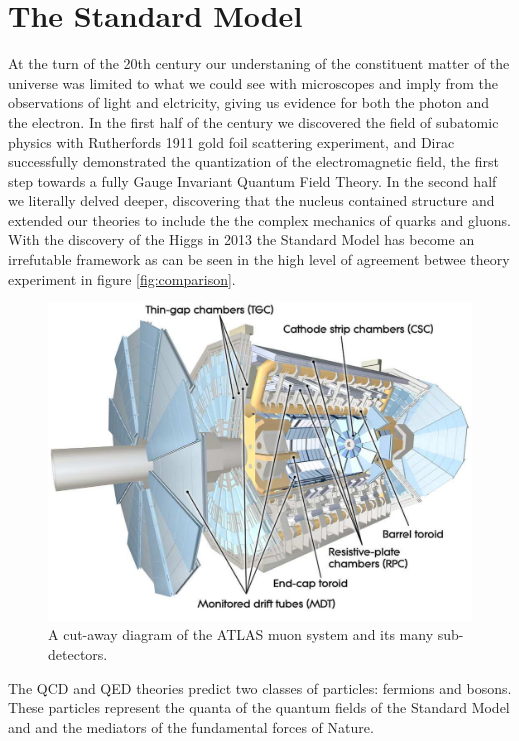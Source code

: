 \section{The Standard Model} \label{sec:theory:standardmodel}

At the turn of the 20th century our understaning of the constituent matter of
the universe was limited to what we could see with microscopes and imply from
the observations of light and elctricity, giving us evidence for both the photon
and the electron.  In the first half of the century we discovered the field of
subatomic physics with Rutherfords 1911 gold foil scattering experiment, and
Dirac successfully demonstrated the quantization of the electromagnetic field,
the first step towards a fully Gauge Invariant Quantum Field Theory.
In the second half we literally delved deeper, discovering that the nucleus
contained structure and extended our theories to include the the complex
mechanics of quarks and gluons.  With the discovery of the Higgs in 2013 the
Standard Model has become an irrefutable framework as can be seen in the high
level of agreement betwee theory experiment in figure \ref{fig:comparison}.

\begin{figure}[!htbp]
  \begin{center}
    \includegraphics[width=0.8\linewidth]{figures/atlas/muon_system}
    \caption{ \cite{PERF-2007-01} A cut-away diagram of the ATLAS muon system
and its many sub-detectors.}
    \label{fig:muon_system}
  \end{center}
\end{figure}

The QCD and QED theories predict two classes of particles: fermions and
bosons. These particles represent the quanta of the quantum fields of the
Standard Model and and the mediators of the fundamental forces of Nature.

